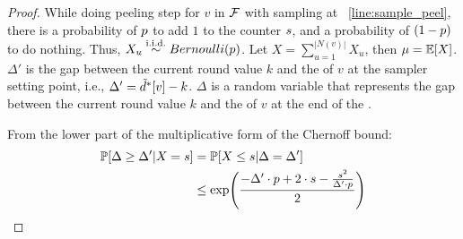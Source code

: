 {\begin{proof}
While doing peeling step for $v$ in ${\mathcal{F}}$ with sampling at ~\cref{line:sample_peel}, 
there is a probability of $p$ to add $1$ to the counter $s$, and a probability of $(1-p)$ to do nothing.
Thus, $X_u \overset{\mathrm{i.i.d.}} \sim Bernoulli(p)$. Let $X = \sum_{u = 1}^{|N(v)|} X_u$, then $\mathit{\mu} = \mathbb{E}[X]$.
$\Delta'$ is the gap between the current round value $k$ and the \induceddegree{} of $v$ at the sampler setting point, i.e., $\Delta' = \tilde{d}^*[v] - k$.
$\Delta$ is a random variable that represents the gap between the current round value $k$ and the \induceddegree{} of $v$ at the end of the \subround.

From the lower part of the multiplicative form of the Chernoff bound: 
        \begin{align*}
        \mathbb{P}[\Delta \geq \Delta' | X = \cntproof] 
        &= \mathbb{P}[X \leq \cntproof | \Delta = \Delta'] \\
        &\leq \exp\left(\frac{-\Delta' \cdot \rateproof + 2 \cdot \cntproof - \frac{{\cntproof}^2}{\Delta' \cdot \rateproof}}{2}\right)
        \end{align*}
        
    
    \end{proof}
}
    


